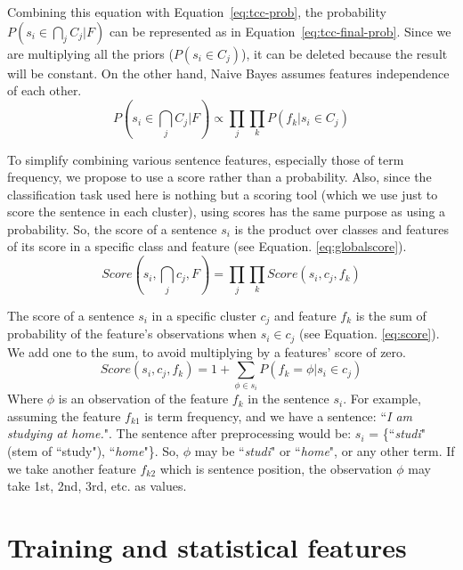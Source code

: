 Combining this equation with Equation~\ref{eq:tcc-prob}, the probability $ P(s_i \in \bigcap_{j} C_j | F) $ can be represented as in Equation~\ref{eq:tcc-final-prob}.
Since we are multiplying all the priors ($P(s_i \in C_j)$), it can be deleted because the result will be constant.
On the other hand, Naive Bayes assumes features independence of each other.
\begin{equation}
\label{eq:tcc-final-prob}
P(s_i \in \bigcap_{j} C_j | F) \propto 
\prod_{j} \prod_{k} P(f_k | s_i \in C_j)
\end{equation}

To simplify combining various sentence features, especially those of term frequency, we propose to use a score rather than a probability.
Also, since the classification task used here is nothing but a scoring tool (which we use just to score the sentence in each cluster), using scores has the same purpose as using a probability.
So, the score of a sentence $ s_i $ is the product over classes and features of its score in a specific class and feature (see Equation. \ref{eq:globalscore}).
%
\begin{equation}
\label{eq:globalscore}
Score(s_i , \bigcap_{j} c_j , F) =  %
\prod_{j} \prod_{k} Score(s_i , c_j , f_k )
\end{equation}

The score of a sentence $ s_i $ in a specific cluster $ c_j $ and feature $ f_k $ is the sum of probability of the feature's observations when $ s_i \in c_j $ (see Equation. \ref{eq:score}).
We add one to the sum, to avoid multiplying by a features' score of zero.
%
\begin{equation}
\label{eq:score}
Score(s_i , c_j , f_k ) = 1 + \sum_{\phi \in s_i} {P(f_k=\phi | s_i \in c_j)}
\end{equation}
%
Where $ \phi $ is an observation of the feature $ f_k $ in the sentence $ s_i $.
For example, assuming the feature $ f_{k1} $ is term frequency, and we have a sentence: ``\textit{I am studying at home.}".
The sentence after preprocessing would be: $ s_i $ = \{``\textit{studi}"(stem of ``study"), ``\textit{home}"\}.
So, $ \phi $ may be ``\textit{studi}" or ``\textit{home}", or any other term.
If we take another feature $ f_{k2} $ which is sentence position, the observation $ \phi $ may take 1st, 2nd, 3rd, etc. as values.


\section{Training and statistical features}

